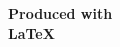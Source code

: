 \documentclass{abnt}
\begin{document}
\pretextualchapter{}

\vspace{20cm}

\begin{center}
\textbf{Produced with} \\
\textbf{\LaTeX}
\end{center}
\end{document}
